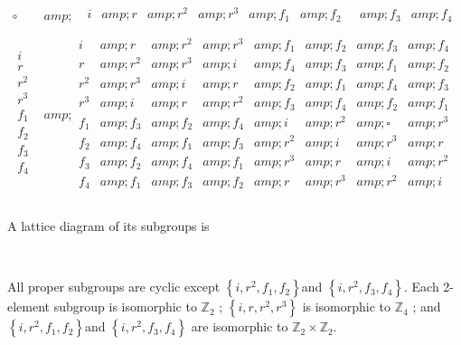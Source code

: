 \(\begin{array}{c|c}
 \circ  &amp; \text{   }
\begin{array}{cccccccc}
 i  &amp; r  &amp; r^2 &amp; r^3  &amp; f_1 &amp;  f_2\text{  } &amp; f_3 &amp; f_4 \\
\end{array}
 \\
\hline
 
\begin{array}{c}
 i \\
 r \\
 r^2 \\
 r^3 \\
 f_1 \\
 f_2 \\
 f_3 \\
 f_4 \\
\end{array}
 &amp; 
\begin{array}{cccccccc}
 i &amp; r &amp; r^2 &amp; r^3 &amp; f_1 &amp; f_2 &amp; f_3 &amp; f_4 \\
 r &amp; r^2 &amp; r^3 &amp; i &amp; f_4 &amp; f_3 &amp; f_1 &amp; f_2 \\
 r^2 &amp; r^3 &amp; i &amp; r &amp; f_2 &amp; f_1 &amp; f_4 &amp; f_3 \\
 r^3 &amp; i &amp; r &amp; r^2 &amp; f_3 &amp; f_4 &amp; f_2 &amp; f_1 \\
 f_1 &amp; f_3 &amp; f_2 &amp; f_4 &amp; i &amp; r^2 &amp; \square  &amp; r^3 \\
 f_2 &amp; f_4 &amp; f_1 &amp; f_3 &amp; r^2 &amp; i &amp; r^3 &amp; r \\
 f_3 &amp; f_2 &amp; f_4 &amp; f_1 &amp; r^3 &amp; r &amp; i &amp; r^2 \\
 f_4 &amp; f_1 &amp; f_3 &amp; f_2 &amp; r &amp; r^3 &amp; r^2 &amp; i \\
\end{array}
 \\
\end{array}\)



A lattice diagram of its subgroups is

\begin{doublespace}
\noindent\(\pmb{}\)
\end{doublespace}



All proper subgroups are cyclic except \(\left\{i,r^2,f_1,f_2\right\}\)\(\text{}\text{}\)and \(\left\{i,r^2,f_3,f_4\right\}\).  Each 2-element
subgroup is isomorphic to \(\mathbb{Z}_2\) ; \(\left\{i,r,r^2,r^3\right\}\) is isomorphic to \(\mathbb{Z}_4\) ; and \(\left\{i,r^2,f_1,f_2\right\}\)\(\text{}\text{}\)and
\(\left\{i,r^2,f_3,f_4\right\}\) are isomorphic to \(\mathbb{Z}_2\times \mathbb{Z}_2\).

